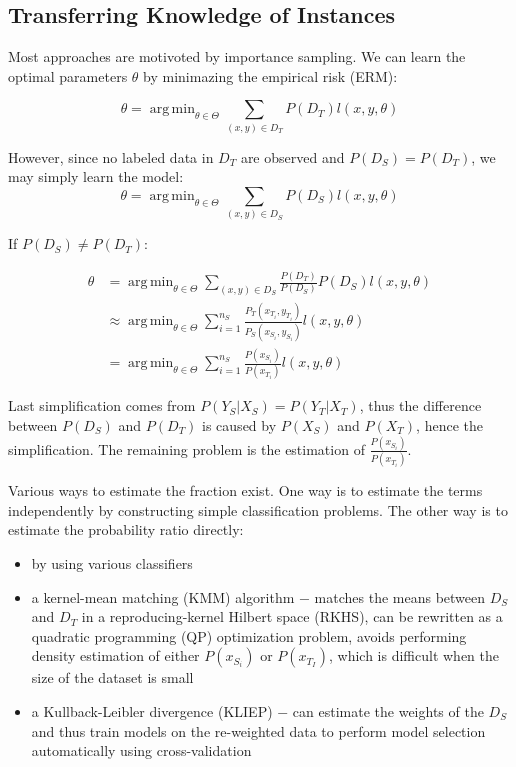 \documentclass[a4paper,twocolumn]{article}
\DeclareMathOperator*{\argmin}{arg\,min}
\begin{document}
\subsection{Transferring Knowledge of Instances}
Most approaches are motivoted by importance sampling. We can learn the optimal parameters $\theta$ by minimazing the empirical risk (ERM):

\[
    \theta = \argmin_{\theta \in \Theta} \sum_{(x,y) \in D_T} P(D_T)l(x, y, \theta)
\]

However, since no labeled data in $D_T$ are observed and $P(D_S) = P(D_T)$, we may simply learn the model:
\[
    \theta = \argmin_{\theta \in \Theta} \sum_{(x,y) \in D_S} P(D_S)l(x, y, \theta)
\]

If $P(D_S) \ne P(D_T)$:

\begin{align*}
    \theta &= \argmin_{\theta \in \Theta} \sum_{(x,y) \in D_S} \frac{P(D_T)}{P(D_S)}P(D_S)l(x, y, \theta) \\
           &\approx \argmin_{\theta \in \Theta} \sum_{i = 1}^{n_S} \frac{P_T(x_{T_i}, y_{T_i})}{P_S(x_{S_i}, y_{S_i})}l(x, y, \theta) \\
           &= \argmin_{\theta \in \Theta} \sum_{i = 1}^{n_S} \frac{P(x_{S_i})}{P(x_{T_i})}l(x, y, \theta)
\end{align*}

Last simplification comes from $P(Y_S|X_S) = P(Y_T|X_T)$, thus the difference between $P(D_S)$ and $P(D_T)$ is caused by $P(X_S)$ and $P(X_T)$, hence the simplification. The remaining problem is the estimation of $\frac{P(x_{S_i})}{P(x_{T_i})}$.

Various ways to estimate the fraction exist. One way is to estimate the terms independently by constructing simple classification problems. The other way is to estimate the probability ratio directly:
\begin{itemize}
    \item by using various classifiers
    \item a kernel-mean matching (KMM) algorithm $-$ matches the means between $D_S$ and $D_T$ in a reproducing-kernel Hilbert space (RKHS), can be rewritten as a quadratic programming (QP) optimization problem, avoids performing density estimation of either $P(x_{S_i})$ or $P(x_{T_I})$, which is difficult when the size of the dataset is small
    \item a Kullback-Leibler divergence (KLIEP) $-$ can estimate the weights of the $D_S$ and thus train models on the re-weighted data to perform model selection automatically using cross-validation
\end{itemize}
\end{document}
